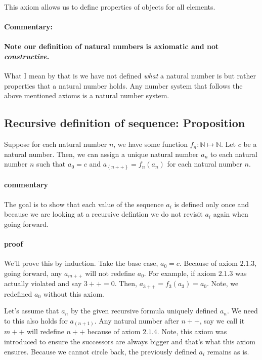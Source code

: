 \documentclass{report}
\begin{document}
This axiom allows us to define properties of objects for all elements.
\paragraph{Commentary: } 

\paragraph{Note our definition of natural numbers is axiomatic and not \textit{constructive}.} What I mean by that is we have not defined \textit{what} a natural number is but rather properties that a natural number holds. Any number system that follows the above mentioned axioms is a natural number system.

\subsection{Recursive definition of sequence: Proposition} Suppose for each natural number $n$, we have some function $f_n: \mathbb{N} \mapsto \mathbb{N}$. Let $c$ be a natural number. Then, we can assign a unique natural number $a_n$ to each natural number $n$ such that $a_0 = c$ and $a_\left\{ n++ \right\} = f_n\left( a_n \right) $ for each natural number $n$.
\paragraph{commentary} The goal is to show that each value of the sequence $a_i$ is defined only once and because we are looking at a recursive defintion we do not revisit $a_i$ again when going forward. 
\paragraph{proof} We'll prove this by induction. Take the base case, $a_0 = c$. Because of axiom $2.1.3$, going forward, any $a_{m++} $ will not redefine $a_0$. For example, if axiom $2.1.3$ was actually violated and say $3++ = 0$. Then, $a_{3++} = f_3\left( a_3 \right) = a_0$. Note, we redefined $a_0$ without this axiom.

Let's assume that $a_n$ by the given recursive formula uniquely defined $a_n$. We need to this also holds for $a_\left( n+1 \right) $. Any natural number after $n++$, say we call it $m++ $ will redefine $n++$ because of axiom $2.1.4$. Note, this axiom was introduced to ensure the successors are always bigger and that's what this axiom ensures. Because we cannot circle back, the previously defined $a_i$ remains as is.
\end{document}
